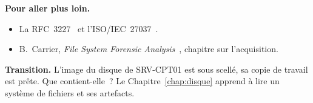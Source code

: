 \bigskip

\begin{boxinfo}
\textbf{Pour aller plus loin.}
\begin{itemize}
    \item La RFC~3227~\cite{rfc3227} et l'ISO/IEC~27037~\cite{iso27037_2012}.
    \item B.~Carrier, \textit{File System Forensic
          Analysis}~\cite{carrier2005}, chapitre sur l'acquisition.
\end{itemize}
\end{boxinfo}

\begin{boxinfo}
\textbf{Transition.} L'image du disque de SRV-CPT01 est sous scellé, sa
copie de travail est prête. Que contient-elle~? Le Chapitre~\ref{chap:disque}
apprend à lire un système de fichiers et ses artefacts.
\end{boxinfo}
